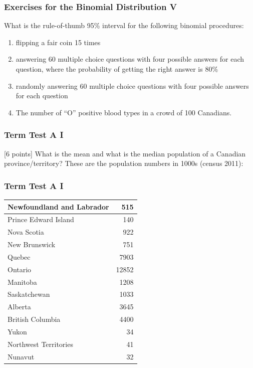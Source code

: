 \documentclass[xcolor=dvipsnames]{beamer}
\begin{document}
\begin{frame}
  \frametitle{Exercises for the Binomial Distribution V}
  {\ubung} What is the rule-of-thumb 95\% interval for the following
  binomial procedures:
  \begin{enumerate}
\item<1-> flipping a fair coin 15 times
\item<2-> answering 60 multiple choice questions with four possible
  answers for each question, where the probability of getting the right answer is 80\%
\item<3-> randomly answering 60 multiple choice questions with four
  possible answers for each question
\item<4-> The number of ``O'' positive blood types in a crowd of 100 Canadians.
  \end{enumerate}
\end{frame}

\begin{frame}
  \frametitle{Term Test A I}
  [6 points] What is the mean and what is the median population of a
  Canadian province/territory? These are the population numbers in
  1000s (census 2011):
\end{frame}

\begin{frame}
  \frametitle{Term Test A I}
  \begin{tabular}{|l|r|} \hline
Newfoundland and Labrador & 515   \\ \hline
Prince Edward Island      & 140   \\ \hline
Nova Scotia               & 922   \\ \hline
New Brunswick             & 751   \\ \hline
Quebec                    & 7903  \\ \hline
Ontario                   & 12852 \\ \hline
Manitoba                  & 1208  \\ \hline
Saskatchewan              & 1033  \\ \hline
Alberta                   & 3645  \\ \hline
British Columbia          & 4400  \\ \hline
Yukon                     & 34    \\ \hline
Northwest Territories     & 41    \\ \hline
Nunavut                   & 32    \\ \hline
\end{tabular}
\end{frame}
\end{document}
